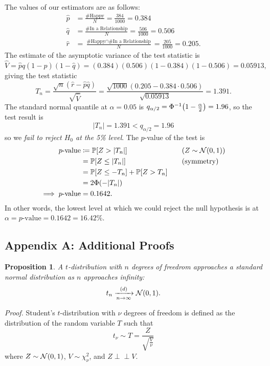 \documentclass[letterpaper, reqno]{amsart}
\newtheorem{prop}{Proposition}[section]
\numberwithin{equation}{section}
\newcommand{\ddfrac}[2]{\frac{\displaystyle #1}{\displaystyle #2}}
\newcommand{\Prob}[1]{\mathbb{P}\mleft[#1\mright]}
\newcommand{\N}[2]{\mathcal{N}\mleft( #1, #2 \mright)}
\newcommand{\indep}{\perp \!\!\! \perp}  %
\newcommand{\by}[1]{&\quad&\text{(#1)}}
\newcommand{\Dlim}{\xrightarrow[n \to \infty]{(d)}}
\newcommand{\phat}{\hat{p}}
\newcommand{\qhat}{\hat{q}}
\newcommand{\rhat}{\hat{r}}
\begin{document}
The values of our estimators are as follows:
\begin{align*}
  \phat &= \frac{\text{\# Happy}}{N} = \frac{384}{1000} = 0.384 \\
  \qhat &= \frac{\text{\# In a Relationship}}{N} = \frac{506}{1000} = 0.506 \\
  \rhat &= \frac{\text{\# Happy} \cap \text{\# In a Relationship}}{N} = \frac{205}{1000} = 0.205.
\end{align*}
The estimate of the asymptotic variance of the test statistic is
\[ \hat{V} = \phat\qhat(1-\phat)(1-\qhat) = (0.384)(0.506)(1 - 0.384)(1 - 0.506)
  = 0.05913, \]
giving the test statistic
\[ T_n = \frac{\sqrt{n}(\rhat - \phat\qhat)}{\sqrt{\hat{V}}}
  = \frac{\sqrt{1000}(0.205 - 0.384\cdot0.506)}{\sqrt{0.05913}} = 1.391. \]
The standard normal quantile at $\alpha = 0.05$ is $q_{\alpha/2}
= \Phi^{-1}\mleft(1
- \frac{\alpha}{2}\mright) = 1.96$, so the test result is
\[ |T_n| = 1.391 < q_{\alpha/2} = 1.96 \]
so we \emph{fail to reject $H_0$ at the 5\% level}. The $p$-value of the test is
\begin{align*}
  \text{$p$-value} &\coloneqq \Prob{Z > |T_n|} \by{$Z \sim \N{0}{1}$}  \\
                   &= \Prob{Z \le |T_n|} \by{symmetry} \\
                   &= \Prob{Z \le -T_n} + \Prob{Z > T_n} \\
                   &= 2\Phi(-|T_n|) \\
  \implies \text{$p$-value} &= 0.1642.
\end{align*}
In other words, the lowest level at which we could reject the null hypothesis is
at $\alpha = \text{$p$-value} = 0.1642 = 16.42\%$.

\clearpage
\subsection*{Appendix A: Additional Proofs} \label{app:t_to_N}
\begin{prop}
  A $t$-distribution with $n$ degrees of freedrom approaches a standard normal
  distribution as $n$ approaches infinity:
  \[ t_n \Dlim \N{0}{1}. \]
\end{prop}

\emph{Proof.}
Student's $t$-distribution with $\nu$ degrees of freedom is defined as the
distribution of the random variable $T$ such that
\[ t_{\nu} \sim T = \ddfrac{Z}{\sqrt{\frac{V}{\nu}}} \]
where $Z \sim \N{0}{1}$, $V \sim \chi^2_{\nu}$, and $Z \indep V$.
\end{document}
